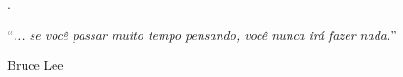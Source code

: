 \begin{epigrafe}
	
	\vspace*{\fill}
	\begin{comment}
	Epígrafe (Opcional). Pensamentos retirados de um livro, uma música, um poema, normalmente relacionado ao tema do trabalho, seguida de indicação de autoria. As epígrafes podem ser colocadas também nas folhas de abertura de cada capítulo
	\end{comment}.  
    
	\epigraph{``\emph{... se você passar muito tempo pensando, você nunca irá fazer nada.}''}{Bruce Lee}
	
\end{epigrafe}